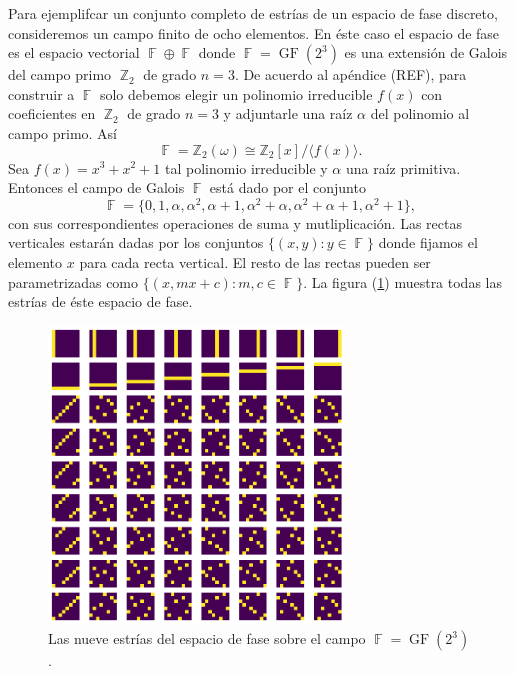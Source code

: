 \documentclass[a4paper]{report}
\DeclareMathOperator{\Z}{\mathbb{Z}}
\DeclareMathOperator{\F}{\mathbb{F}}
\DeclareMathOperator{\GF}{GF}
\begin{document}
  Para ejemplifcar un conjunto completo de estrías de un
  espacio de fase discreto, consideremos un campo finito de
  ocho elementos. En éste caso el espacio de fase es el
  espacio vectorial $\F \oplus \F$ donde $\F =
  \GF\left(2^3\right)$ es una extensión de Galois del campo
  primo $\Z_2$ de grado $n = 3$. De acuerdo al apéndice
  (REF), para construir a $\F$ solo debemos elegir un
  polinomio irreducible $f(x)$ con coeficientes en $\Z_2$ de
  grado $n = 3$ y adjuntarle una raíz $\alpha$ del polinomio
  al campo primo. Así
  \[
    \F
    = \mathbb Z_2(\omega)
    \cong \mathbb Z_2[x] / \langle f(x) \rangle.
  \] 
  Sea $f(x) = x^3+x^2+1$ tal polinomio irreducible y
  $\alpha$ una raíz primitiva. Entonces el campo de Galois
  $\F$ está dado por el conjunto 
  \[
    \F = \{
      0, 1, \alpha, \alpha^2, \alpha+1, \alpha^2+\alpha,
      \alpha^2 + \alpha + 1, \alpha^2 + 1
    \},
  \] 
  con sus correspondientes operaciones de suma y
  mutliplicación. Las rectas verticales estarán dadas por
  los conjuntos $\{(x,y) : y \in \F\}$ donde fijamos el
  elemento $x$ para cada recta vertical. El resto de las
  rectas pueden ser parametrizadas como $\{(x,mx+c) : m, c
  \in \F\}$. La figura (\ref{fig:GF-2-3}) muestra todas las
  estrías de éste espacio de fase.

  \begin{figure}[ht]
    \centering
    \includegraphics[width=0.7\textwidth]{imgs/GF23.png}
    \caption{Las nueve estrías del espacio de fase sobre el
      campo $\F = \GF\left(2^3\right)$.}
    \label{fig:GF-2-3}
  \end{figure}
\end{document}

